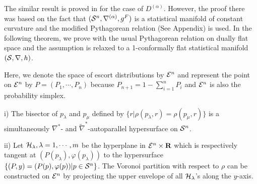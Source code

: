 \documentclass{llncs}
\begin{document}
The similar result is proved in \cite{OMA12} for the case of $D^{(\alpha)}$.
However, the proof there was based on the fact that 
$({\cal S}^n,\nabla^{(\alpha)},g^F)$ is a statistical manifold of 
constant curvature and the modified Pythagorean relation (See Appendix) 
is used.
In the following theorem, we prove with the usual Pythagorean 
relation on dually flat space and 
the assumption is relaxed to a 1-conformally flat 
statistical manifold $({\cal S}, \nabla, h)$.

Here, we denote the space of escort distributions by ${\cal E}^n$ and 
represent the point on ${\cal E}^n$ by $P=(P_1,\cdots,P_n)$ because 
$P_{n+1}=1-\sum_{i=1}^n P_i$ and ${\cal E}^n$ is also the probability 
simplex.

\begin{theorem}
\begin{description}
\item{i)} The bisector of $p_\lambda$ and $p_\mu$ defined by 
$\{r |\rho(p_\lambda,r)=\rho(p_\mu,r)\}$ 
is a simultaneously $\nabla^*$- and $\tilde \nabla^*$-autoparallel 
hypersurface on ${\cal S}^n$.
\item{ii)} 
Let ${\cal H}_\lambda, \lambda=1,\cdots,m$ be the hyperplane in 
${\cal E}^n \times {\bf R}$ which is respectively tangent 
at $(P(p_\lambda),  \varphi(p_\lambda))$ to the hypersurface 
$\{(P,y)=(P(p), \varphi(p)) | p \in {\cal S}^n \}$. %
The Voronoi partition with respect to $\rho$
can be constructed on ${\cal E}^n$ by projecting 
the upper envelope of all ${\cal H}_\lambda$'s 
along the $y$-axis.
\end{description}
\end{theorem}
\end{document}

